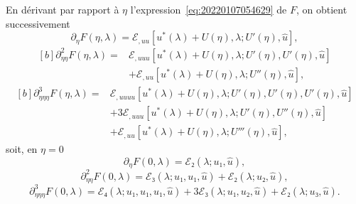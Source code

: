 \documentclass[12pt, final]{amsart}
\theoremstyle{definition}
\begin{document}
En dérivant par rapport à \(η\) l'expression~\eqref{eq:20220107054629} de \(F\),
on obtient successivement
\begin{equation}
 ∂_{η}F(η, λ) = ℰ_{, u u}[u^{\ast}(λ) + U(η), λ; U'(η), \hat{u}],
\end{equation}
\begin{equation}
  \begin{aligned}[b]
    ∂_{η η}^2 F(η, λ) ={}
    & ℰ_{, uuu}[u^{\ast}(λ) + U(η), λ; U'(η), U'(η), \hat{u}]\\
    & + ℰ_{, uu} [u^{\ast}(λ) + U(η), λ; U''(η), \hat{u}],
  \end{aligned}
\end{equation}
\begin{equation}
  \begin{aligned}[b]
    ∂_{ηηη}^3 F(η, λ) ={}
    & ℰ_{, uuuu}[u^{\ast}(λ) + U(η), λ; U'(η), U'(η), U'(η), \hat{u}]\\
    & + 3ℰ_{, u u u}[u^{\ast}(λ) + U(η), λ; U'(η), U''(η), \hat{u}]\\
    & + ℰ_{, uu}[u^{\ast}(λ) + U(η), λ; U'''(η), \hat{u}],
  \end{aligned}
\end{equation} 
soit, en \(η = 0\)
\begin{equation}
  ∂_{η}F(0, λ) = ℰ₂(λ; u₁, \hat{u}),
\end{equation}
\begin{equation}
 ∂_{ηη}^2 F(0, λ) = ℰ₃(λ; u₁, u₁, \hat{u}) + ℰ₂(λ; u₂, \hat{u}),
\end{equation}
\begin{equation}
 ∂_{ηηη}^3 F(0, λ) = ℰ₄(λ; u₁, u₁, u₁, \hat{u}) + 3ℰ₃(λ; u₁, u₂, \hat{u}) + ℰ₂(λ; u₃, \hat{u}).
\end{equation}
\end{document}
